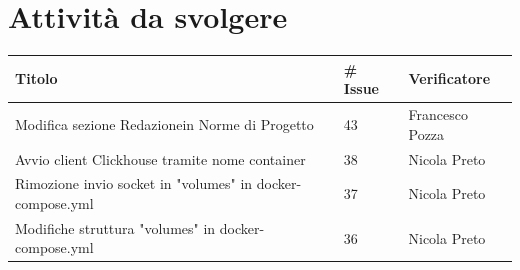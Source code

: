 \documentclass{article}
\begin{document}
\section{Attività da svolgere}
    \begin{center}
        \begin{tabular}{|C{7cm}|C{1,5cm}|C{3cm}|}
            \hline
            \textbf{Titolo} & \textbf{\# Issue} & \textbf{Verificatore} \\
            \hline\hline
            Modifica sezione Redazionein Norme di Progetto & 43 & Francesco Pozza \\
            Avvio client Clickhouse tramite nome container & 38 & Nicola Preto \\
            Rimozione invio socket in "volumes" in docker-compose.yml & 37 & Nicola Preto \\
            Modifiche struttura "volumes" in docker-compose.yml & 36 & Nicola Preto\\
            \hline
        \end{tabular}
    \end{center}
\end{document}
